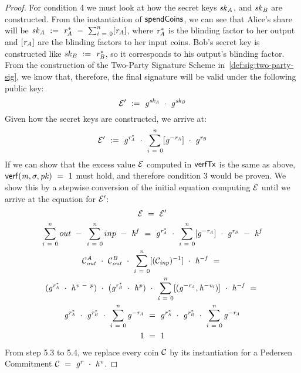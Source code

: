 \begin{proof}
    For condition 4 we must look at how the secret keys $\mathit{sk}_{\mathit{A}}$, and $\mathit{sk}_{\mathit{B}}$ are constructed.
    From the instantiation of $\mathsf{spendCoins}$, we can see that Alice's share will be $\mathit{sk}_{\mathit{A}} ~:=~ \mathit{r}_{\mathit{A}}^* ~-~ \sum_{\mathit{i} ~=~ 0}^{\mathit{n}} [\mathit{r}_{\mathit{A}}]$, where $\mathit{r}_{\mathit{A}}^*$ is the blinding factor to her output and $[\mathit{r}_{\mathit{A}}]$ are the blinding factors to her input coins.
    Bob's secret key is constructed like $\mathit{sk}_{\mathit{B}} ~:=~ \mathit{r}_{\mathit{B}}^*$, so it corresponds to his output's blinding factor.
    From the construction of the Two-Party Signature Scheme in~\cref{def:sig:two-party-sig}, we know that, therefore, the final signature will be valid under the following public key:
    \[ {\mathcal{E}}' ~:=~ \mathit{g}^{\mathit{sk}_{\mathit{A}}} ~\cdot~ \mathit{g}^{\mathit{sk}_{\mathit{B}}} \]
    Given how the secret keys are constructed, we arrive at:
    \[ {\mathcal{E}}' ~:=~ \mathit{g}^{\mathit{r}_{\mathit{A}}^*} ~\cdot~ \sum_{\mathit{i} ~=~ 0}^{\mathit{n}} [\mathit{g}^{- \mathit{r}_{\mathit{A}}}] ~\cdot~ \mathit{g}^{\mathit{r}_{\mathit{B}}} \]
    If we can show that the excess value $\mathcal{E}$ computed in $\mathsf{verfTx}$ is the same as above, $\mathsf{verf}(\mathit{m}, \sigma, \mathit{pk}) ~=~ 1$ must hold, and therefore condition 3 would be proven.
    We show this by a stepwise conversion of the initial equation computing $\mathcal{E}$ until we arrive at the equation for ${\mathcal{E}}'$:
    \begin{gather}
        \mathcal{E} ~=~ {\mathcal{E}}' \\
        \sum_{\mathit{i} ~=~ 0}^{\mathit{n}} out ~-~ \sum_{\mathit{i} ~=~ 0}^{\mathit{n}} inp ~-~ \mathit{h}^{\mathit{f}}  ~=~ \mathit{g}^{\mathit{r}_{\mathit{A}}^*} ~\cdot~ \sum_{\mathit{i} ~=~ 0}^{\mathit{n}} [\mathit{g}^{- \mathit{r}_{\mathit{A}}}] ~\cdot~ \mathit{g}^{\mathit{r}_{\mathit{B}}} ~-~ \mathit{h}^{\mathit{f}} \\
        \mathcal{C}_{\mathit{out}}^{\mathit{A}} ~\cdot~ \mathcal{C}_{\mathit{out}}^{\mathit{B}} ~\cdot~ \sum_{\mathit{i} ~=~ 0}^{\mathit{n}} [(\mathcal{C}_{\mathit{inp}})^{-1}] ~\cdot~ \mathit{h}^{- \mathit{f}}  ~=~\\
        (\mathit{g}^{\mathit{r}_{\mathit{A}}^*} ~\cdot~ \mathit{h}^{\mathit{v} ~-~ \mathit{p}}) ~\cdot~
        (\mathit{g}^{\mathit{r}_{\mathit{B}}^*} ~\cdot~ \mathit{h}^{\mathit{p}}) ~\cdot~
        \sum_{\mathit{i} ~=~ 0}^{\mathit{n}} [(\mathit{g}^{- \mathit{r}_{\mathit{A}}}, \mathit{h}^{- \mathit{v}_i})] ~\cdot~ \mathit{h}^{- \mathit{f}} ~=~ \\
        \mathit{g}^{\mathit{r}_{\mathit{A}}^*} ~\cdot~ \mathit{g}^{\mathit{r}_{\mathit{B}}^*} ~\cdot~ \sum_{\mathit{i} ~=~ 0}^{\mathit{n}} \mathit{g}^{- \mathit{r}_{\mathit{A}}} ~=~ \mathit{g}^{\mathit{r}_{\mathit{A}}^*} ~\cdot~ \mathit{g}^{\mathit{r}_{\mathit{B}}^*} ~\cdot~ \sum_{\mathit{i} ~=~ 0}^{\mathit{n}} \mathit{g}^{- \mathit{r}_{\mathit{A}}} \\
        1 ~=~ 1
    \end{gather}
    From step 5.3 to 5.4, we replace every coin $\mathcal{C}$ by its instantiation for a Pedersen Commitment $\mathcal{C} ~=~ \mathit{g}^{\mathit{r}} ~\cdot~ \mathit{h}^{\mathit{v}}$.


\end{proof}
